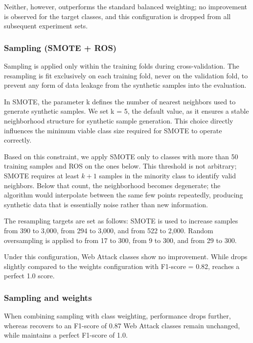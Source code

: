 Neither, however, outperforms the standard balanced weighting; no improvement is observed for the target classes, and this configuration is dropped from all subsequent experiment sets.


\subsubsection{Sampling (SMOTE + ROS)}

Sampling is applied only within the training folds during cross-validation. The resampling is fit exclusively on each training fold, never on the validation fold, to prevent any form of data leakage from the synthetic samples into the evaluation.

In SMOTE, the parameter k defines the number of nearest neighbors used to generate synthetic samples. We set k = 5, the default value, as it ensures a stable neighborhood structure for synthetic sample generation. This choice directly influences the minimum viable class size required for SMOTE to operate correctly.

Based on this constraint, we apply SMOTE only to classes with more than 50 training samples and ROS on the ones below. This threshold is not arbitrary; SMOTE requires at least $k + 1$ samples in the minority class to identify valid neighbors. Below that count, the neighborhood becomes degenerate; the algorithm would interpolate between the same few points repeatedly, producing synthetic data that is essentially noise rather than new information.

The resampling targets are set as follows:
SMOTE is used to increase  samples from 390 to 3,000,  from 294 to 3,000, and  from 522 to 2,000.
Random oversampling is applied to  from 17 to 300,  from 9 to 300, and  from 29 to 300.

Under this configuration, Web Attack classes show no improvement. While  drops slightly compared to the weights configuration with F1-score = 0.82,  reaches a perfect 1.0 score.

\subsubsection{Sampling and weights}

When combining sampling with class weighting,  performance drops further, whereas  recovers to an F1-score of 0.87 Web Attack classes remain unchanged, while  maintains a perfect F1-score of 1.0.


